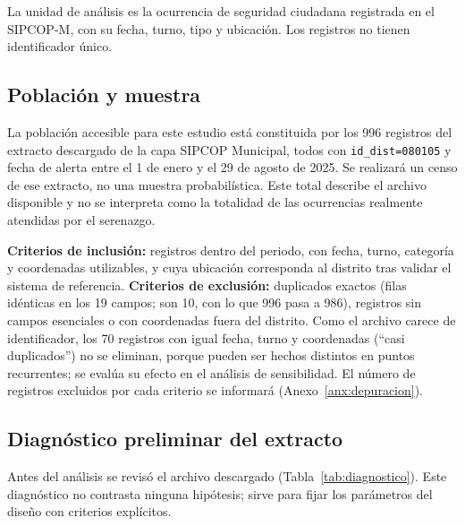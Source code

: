 La unidad de análisis es la ocurrencia de seguridad ciudadana registrada en el SIPCOP-M, con su fecha, turno, tipo y ubicación. Los registros no tienen identificador único.

\subsection{Población y muestra}

La población accesible para este estudio está constituida por los 996 registros del extracto descargado de la capa SIPCOP Municipal, todos con \texttt{id\_dist=080105} y fecha de alerta entre el 1 de enero y el 29 de agosto de 2025. Se realizará un censo de ese extracto, no una muestra probabilística. Este total describe el archivo disponible y no se interpreta como la totalidad de las ocurrencias realmente atendidas por el serenazgo.

\textbf{Criterios de inclusión:} registros dentro del periodo, con fecha, turno, categoría y coordenadas utilizables, y cuya ubicación corresponda al distrito tras validar el sistema de referencia. \textbf{Criterios de exclusión:} duplicados exactos (filas idénticas en los 19 campos; son 10, con lo que 996 pasa a 986), registros sin campos esenciales o con coordenadas fuera del distrito. Como el archivo carece de identificador, los 70 registros con igual fecha, turno y coordenadas (``casi duplicados'') no se eliminan, porque pueden ser hechos distintos en puntos recurrentes; se evalúa su efecto en el análisis de sensibilidad. El número de registros excluidos por cada criterio se informará (Anexo~\ref{anx:depuracion}).

\subsection{Diagnóstico preliminar del extracto}

Antes del análisis se revisó el archivo descargado (Tabla~\ref{tab:diagnostico}). Este diagnóstico no contrasta ninguna hipótesis; sirve para fijar los parámetros del diseño con criterios explícitos.


